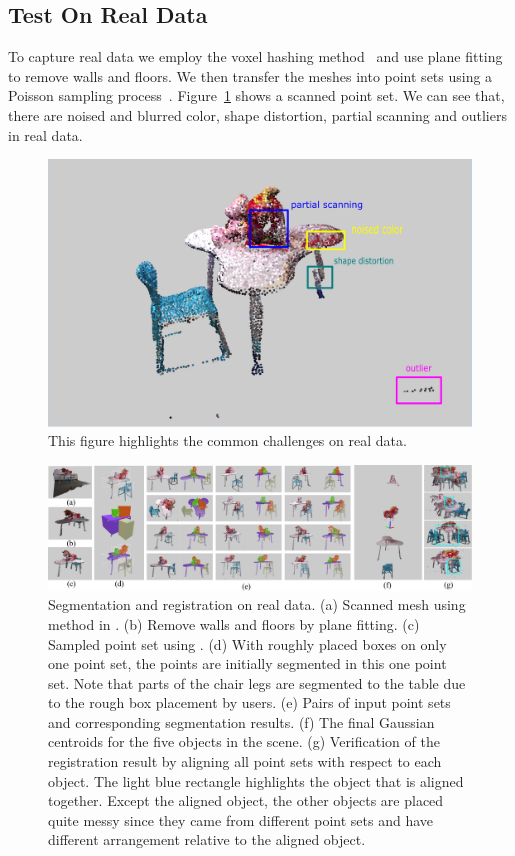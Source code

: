 \subsection{Test On Real Data}
To capture real data we employ the voxel hashing method~\cite{VXH} and use plane fitting to remove walls and floors. 
We then transfer the meshes into point sets using a Poisson sampling process~\cite{PossionSampling}.
Figure~\ref{fig:challenge} shows a scanned point set. We can see that, there are noised and blurred color, shape distortion, partial scanning and outliers in real data.
%
\begin{figure}
	\centering
	\includegraphics[width=\linewidth]{images/challenge/challenge}
	\caption{\label{fig:challenge}This figure highlights the common challenges on real data.}
\end{figure}
\begin{figure}[htb]
	\centering
	\includegraphics[width=\linewidth]{images/realdata/realdata}
	\caption{\label{fig:realdata} Segmentation and registration on real data. (a) Scanned mesh using method in \cite{VXH}. (b) Remove walls and floors by plane fitting. (c) Sampled point set using \cite{PossionSampling}. (d) With roughly placed boxes on only one point set, the points are initially segmented in this one point set. Note that parts of the chair legs are segmented to the table due to the rough box placement by users. (e) Pairs of input point sets and corresponding segmentation results. (f) The final Gaussian centroids for the five objects in the scene. (g) Verification of the registration result by aligning all point sets with respect to each object. The light blue rectangle highlights the object that is aligned together. Except the aligned object, the other objects are placed quite messy since they came from different point sets and have different arrangement relative to the aligned object.   }
\end{figure}
